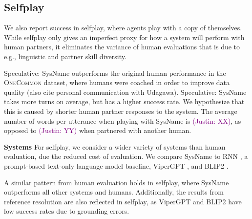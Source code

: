 \documentclass[11pt]{article}
\newcommand{\system}{SysName}
\newcommand{\justin}[1]{{{\textcolor{purple}{(Justin: #1)}}}}
\begin{document}
\subsection{Selfplay}
We also report success in selfplay, where agents play with a copy of themselves.
While selfplay only gives an imperfect proxy for how a system will perform with human partners, it eliminates the variance of human evaluations that is due to e.g., linguistic and partner skill diversity.

Speculative: \system{} outperforms the original human performance in
the \textsc{OneCommon} dataset,
where humans were coached in order to improve data quality \citep{onecommon}
(also cite personal communication with Udagawa).
Speculative: \system{} takes more turns on average, but
has a higher success rate.
We hypothesize that this is caused by shorter human partner
responses to the system.
The average number of words per utterance when playing with \system{} is \justin{XX},
as opposed to \justin{YY} when partnered with another human.

\textbf{Systems}
For selfplay, we consider a wider variety of systems than human evaluation, due the reduced cost of evaluation.
We compare \system{} to RNN \citep{fried},
a prompt-based text-only language model baseline,
ViperGPT \citep{vipergpt},
and BLIP2 \citep{blip2}.

\begin{table}[!t]
\centering
{}
\caption{\label{tbl:selfplay}
The success rate of different agents in 200 selfplay games on the hardest setting of \textsc{OneCommon}, with 4 shared dots.
A higher success rate is better.
The human performance is from the \textsc{OneCommon} dataset
\citep{onecommon}.
}
\end{table}

A similar pattern from human evaluation holds in selfplay,
where \system{} outperforms all other systems and humans.
Additionally, the results from reference resolution are also reflected in selfplay,
as ViperGPT and BLIP2 have low success rates due to grounding errors.
\end{document}

